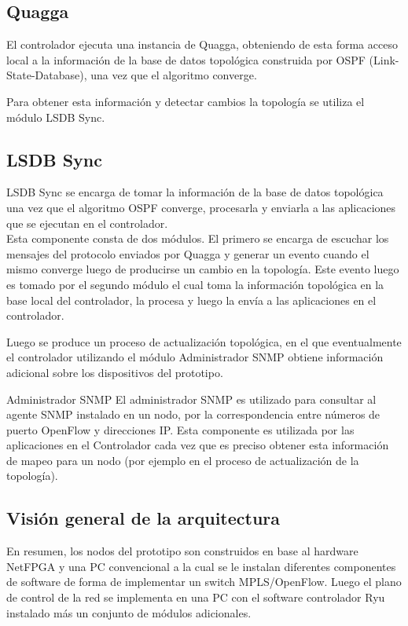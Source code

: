 \subsection{Quagga}
El controlador ejecuta una instancia de Quagga, obteniendo de esta forma acceso local a la información de la base de datos topol\'ogica construida por OSPF (Link-State-Database), una vez que el algoritmo converge.

Para obtener esta informaci\'on y detectar cambios la topolog\'ia se utiliza el m\'odulo LSDB Sync.

\subsection{LSDB Sync}
LSDB Sync se encarga de tomar la información de la base de datos topol\'ogica una vez que el algoritmo OSPF converge, procesarla y enviarla a las aplicaciones que se ejecutan en el controlador.\\

Esta componente consta de dos módulos. El primero se encarga de escuchar los mensajes del protocolo enviados por Quagga y generar un evento cuando el mismo converge luego de producirse un cambio en la topolog\'ia. Este evento luego es tomado por el segundo m\'odulo el cual toma la información topol\'ogica en la base local del controlador, la procesa y luego la env\'ia a las aplicaciones en el controlador.

Luego se produce un proceso de actualizaci\'on topol\'ogica, en el que eventualmente el controlador utilizando el m\'odulo Administrador SNMP obtiene informaci\'on adicional sobre los dispositivos del prototipo. 

\begin{subsection}{Administrador SNMP}
El administrador SNMP es utilizado para consultar al agente SNMP instalado en un nodo, por la correspondencia entre números de puerto OpenFlow y direcciones IP. Esta componente es utilizada por las aplicaciones en el Controlador cada vez que es preciso obtener esta información de mapeo para un nodo (por ejemplo en el proceso de actualización de la topolog\'ia).

\end{subsection}

\subsection{Visi\'on general de la arquitectura}

En resumen, los nodos del prototipo son construidos en base al hardware NetFPGA y una PC convencional a la cual se le instalan diferentes componentes de software de forma de implementar un switch MPLS/OpenFlow. Luego el plano de control de la red se implementa en una PC con el software controlador Ryu instalado m\'as un conjunto de m\'odulos adicionales.

